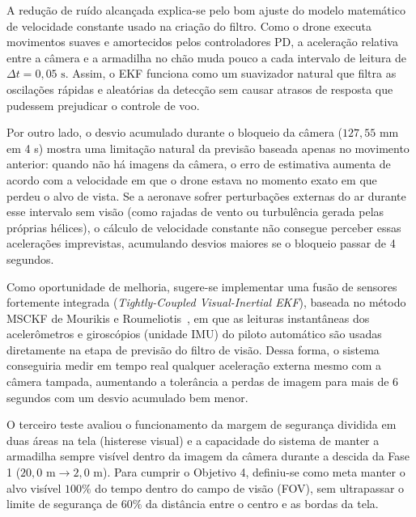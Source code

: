 
A redução de ruído alcançada explica-se pelo bom ajuste do modelo matemático de velocidade constante usado na criação do filtro. Como o drone executa movimentos suaves e amortecidos pelos controladores PD, a aceleração relativa entre a câmera e a armadilha no chão muda pouco a cada intervalo de leitura de $\Delta t = 0,05\text{ s}$. Assim, o EKF funciona como um suavizador natural que filtra as oscilações rápidas e aleatórias da detecção sem causar atrasos de resposta que pudessem prejudicar o controle de voo.

Por outro lado, o desvio acumulado durante o bloqueio da câmera ($127,55\text{ mm}$ em 4 s) mostra uma limitação natural da previsão baseada apenas no movimento anterior: quando não há imagens da câmera, o erro de estimativa aumenta de acordo com a velocidade em que o drone estava no momento exato em que perdeu o alvo de vista. Se a aeronave sofrer perturbações externas do ar durante esse intervalo sem visão (como rajadas de vento ou turbulência gerada pelas próprias hélices), o cálculo de velocidade constante não consegue perceber essas acelerações imprevistas, acumulando desvios maiores se o bloqueio passar de 4 segundos.

Como oportunidade de melhoria, sugere-se implementar uma fusão de sensores fortemente integrada (\textit{Tightly-Coupled Visual-Inertial EKF}), baseada no método MSCKF de Mourikis e Roumeliotis~\cite{mourikis2007mscfk}, em que as leituras instantâneas dos acelerômetros e giroscópios (unidade IMU) do piloto automático são usadas diretamente na etapa de previsão do filtro de visão. Dessa forma, o sistema conseguiria medir em tempo real qualquer aceleração externa mesmo com a câmera tampada, aumentando a tolerância a perdas de imagem para mais de 6 segundos com um desvio acumulado bem menor.


O terceiro teste avaliou o funcionamento da margem de segurança dividida em duas áreas na tela (histerese visual) e a capacidade do sistema de manter a armadilha sempre visível dentro da imagem da câmera durante a descida da Fase 1 ($20,0\text{ m} \to 2,0\text{ m}$). Para cumprir o Objetivo 4, definiu-se como meta manter o alvo visível $100\%$ do tempo dentro do campo de visão (FOV), sem ultrapassar o limite de segurança de $60\%$ da distância entre o centro e as bordas da tela.

